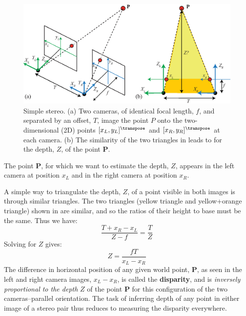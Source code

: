 \begin{figure}
\centerline{
\includegraphics[width=1\linewidth]{figures/3d_scene_understanding/triangularization_stereo.eps}
}
\caption{Simple stereo. (a) Two cameras, of identical focal length, $f$, and separated by an offset, $T$, image the point $P$ onto the two-dimensional (2D) points $[x_L,y_L]^\transpose$ and $[x_R,y_R]^\transpose$ at each camera.  (b) The similarity of the two triangles in leads to \eqn{\ref{eq:depthFromDisparity}} for the depth, $Z$, of the point $\mathbf{P}$.}
\label{fig:stereo}
\end{figure}

The point $\mathbf{P}$, for which we want to estimate the depth, $Z$, appears in the left camera at position $x_L$ and in the right camera at position $x_R$.  



A simple way to triangulate the depth, $Z$, of a point visible in both images is through similar triangles.  The two triangles (yellow triangle and yellow+orange triangle) shown in  are similar, and so the ratios of their height to base must be the same.  Thus we have:
\begin{equation}
    \frac{T+x_R-x_L}{Z-f} = \frac{T}{Z}
\end{equation}
Solving for $Z$ gives:
\begin{equation}
    Z =  \frac{fT}{x_L-x_R}
    \label{eq:depthFromDisparity}
\end{equation}
The difference in horizontal position of any given world point, $\mathbf{P}$, as seen in the left and right camera images, $x_L - x_R$, is called the {\bf disparity},
and is {\em inversely proportional to the depth} $Z$ of the point $\mathbf{P}$ for this configuration of the two cameras--parallel orientation.  The task of inferring depth of any point in either image of a stereo pair thus reduces to measuring the disparity everywhere.

